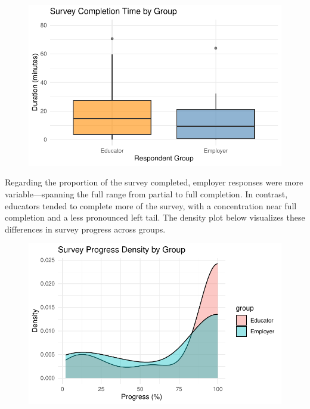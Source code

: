 \documentclass[
  11pt,
  letterpaper,
  DIV=11,
  numbers=noendperiod]{scrartcl}
\begin{document}
\begin{figure}[H]

{\centering \includegraphics{Final-Project_files/figure-pdf/Data_Desc_01-1.pdf}

}

\end{figure}

Regarding the proportion of the survey completed, employer responses
were more variable---spanning the full range from partial to full
completion. In contrast, educators tended to complete more of the
survey, with a concentration near full completion and a less pronounced
left tail. The density plot below visualizes these differences in survey
progress across groups.

\begin{figure}[H]

{\centering \includegraphics{Final-Project_files/figure-pdf/Data_Desc_02-1.pdf}

}

\end{figure}
\end{document}
